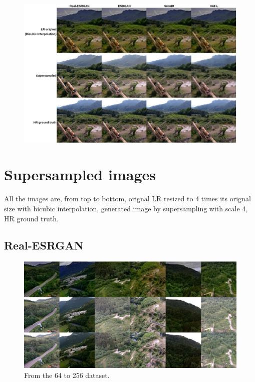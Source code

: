 \begin{figure}[H]
  \includegraphics[scale=0.3]{figures/allegati/sbs_3.png}
  \label{img:sbs3}
\end{figure}

\section{Supersampled images}
All the images are, from top to bottom, orignal LR resized to 4 times its orignal size with bicubic interpolation, generated image by supersampling with scale 4, HR ground truth.
\subsection{Real-ESRGAN}

\begin{figure}[H]
  \centering
  \includegraphics[scale=0.37]{figures/allegati/realesrgan64.png}
  \caption{From the 64 to 256 dataset.}
  \label{img:realesrgan_training}
\end{figure}

